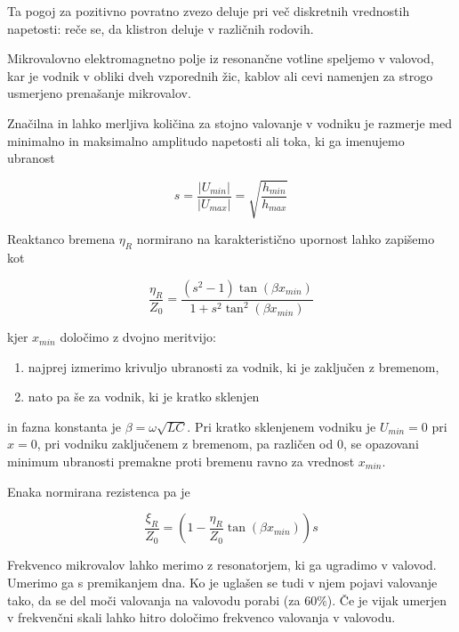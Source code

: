 \documentclass[11pt]{article}
\begin{document}
Ta pogoj za pozitivno povratno zvezo deluje pri več diskretnih vrednostih napetosti: reče se, da klistron deluje v različnih rodovih.

Mikrovalovno elektromagnetno polje iz resonančne votline speljemo v valovod, kar je vodnik v obliki dveh vzporednih žic, kablov ali cevi namenjen za strogo usmerjeno prenašanje mikrovalov.

Značilna in lahko merljiva količina za stojno valovanje v vodniku je razmerje med minimalno in maksimalno amplitudo napetosti ali toka, ki ga imenujemo ubranost

\begin{equation}
\label{eq:1}
s = \frac{\left| U_{min} \right|}{\left| U_{max} \right|} = \sqrt{\frac{h_{min}}{h_{max}}}
\end{equation}

Reaktanco bremena \(\eta_R\) normirano na karakteristično upornost lahko zapišemo kot

\begin{equation}
\label{eq:2}
\frac{\eta_R}{Z_0} = \frac{(s ^2 - 1) \tan (\beta x_{min})}{1 + s ^2 \tan ^2(\beta x_{min})}
\end{equation}

kjer \(x_{min}\) določimo z dvojno meritvijo:

\begin{enumerate}
\item najprej izmerimo krivuljo ubranosti za vodnik, ki je zaključen z bremenom,
\item nato pa še za vodnik, ki je kratko sklenjen
\end{enumerate}

in fazna konstanta je  \(\beta = \omega \sqrt{LC}\).
Pri kratko sklenjenem vodniku je \(U_{min} = 0\) pri \(x = 0\), pri vodniku
zaključenem z bremenom, pa različen od 0, se opazovani minimum ubranosti
premakne proti bremenu ravno za vrednost \(x_{min}\).


Enaka normirana rezistenca pa je

\begin{equation}
\label{eq:3}
\frac{\xi_R}{Z_0} = (1 - \frac{\eta_R}{Z_0} \tan \left(\beta x_{min}\right))s
\end{equation}

Frekvenco mikrovalov lahko merimo z resonatorjem, ki ga ugradimo v valovod.
Umerimo ga s premikanjem dna. Ko je uglašen se tudi v njem pojavi valovanje tako,
da se del moči valovanja na valovodu porabi (za \(60\%\)). Če je vijak umerjen v
frekvenčni skali lahko hitro določimo frekvenco valovanja v valovodu.
\end{document}
